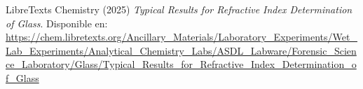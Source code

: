 \begin{thebibliography}{3}


     LibreTexts Chemistry (2025) \textit{Typical Results for Refractive Index Determination of Glass}.
    Disponible en: \url{https://chem.libretexts.org/Ancillary_Materials/Laboratory_Experiments/Wet_Lab_Experiments/Analytical_Chemistry_Labs/ASDL_Labware/Forensic_Science_Laboratory/Glass/Typical_Results_for_Refractive_Index_Determination_of_Glass}


\end{thebibliography}

